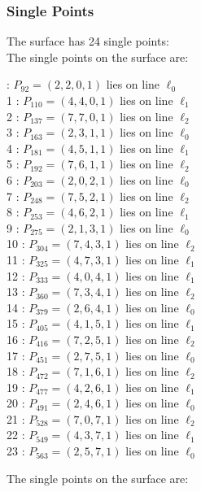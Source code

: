 \documentclass{article}
\begin{document}
{\subsubsection*{Single Points}
The surface has 24 single points:\\
The single points on the surface are:\\
\begin{multicols}{2}
 : $P_{92}=( 2, 2, 0, 1 )$ lies on line $\ell_{0}$\\
1 : $P_{110}=( 4, 4, 0, 1 )$ lies on line $\ell_{1}$\\
2 : $P_{137}=( 7, 7, 0, 1 )$ lies on line $\ell_{2}$\\
3 : $P_{163}=( 2, 3, 1, 1 )$ lies on line $\ell_{0}$\\
4 : $P_{181}=( 4, 5, 1, 1 )$ lies on line $\ell_{1}$\\
5 : $P_{192}=( 7, 6, 1, 1 )$ lies on line $\ell_{2}$\\
6 : $P_{203}=( 2, 0, 2, 1 )$ lies on line $\ell_{0}$\\
7 : $P_{248}=( 7, 5, 2, 1 )$ lies on line $\ell_{2}$\\
8 : $P_{253}=( 4, 6, 2, 1 )$ lies on line $\ell_{1}$\\
9 : $P_{275}=( 2, 1, 3, 1 )$ lies on line $\ell_{0}$\\
10 : $P_{304}=( 7, 4, 3, 1 )$ lies on line $\ell_{2}$\\
11 : $P_{325}=( 4, 7, 3, 1 )$ lies on line $\ell_{1}$\\
12 : $P_{333}=( 4, 0, 4, 1 )$ lies on line $\ell_{1}$\\
13 : $P_{360}=( 7, 3, 4, 1 )$ lies on line $\ell_{2}$\\
14 : $P_{379}=( 2, 6, 4, 1 )$ lies on line $\ell_{0}$\\
15 : $P_{405}=( 4, 1, 5, 1 )$ lies on line $\ell_{1}$\\
16 : $P_{416}=( 7, 2, 5, 1 )$ lies on line $\ell_{2}$\\
17 : $P_{451}=( 2, 7, 5, 1 )$ lies on line $\ell_{0}$\\
18 : $P_{472}=( 7, 1, 6, 1 )$ lies on line $\ell_{2}$\\
19 : $P_{477}=( 4, 2, 6, 1 )$ lies on line $\ell_{1}$\\
20 : $P_{491}=( 2, 4, 6, 1 )$ lies on line $\ell_{0}$\\
21 : $P_{528}=( 7, 0, 7, 1 )$ lies on line $\ell_{2}$\\
22 : $P_{549}=( 4, 3, 7, 1 )$ lies on line $\ell_{1}$\\
23 : $P_{563}=( 2, 5, 7, 1 )$ lies on line $\ell_{0}$\\
\end{multicols}
The single points on the surface are:\\
}
\end{document}
